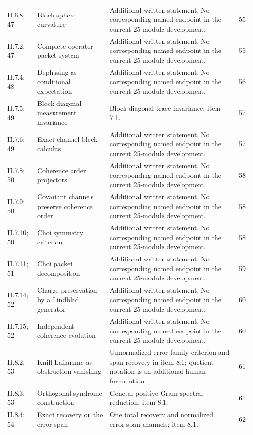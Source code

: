 {\begin{longtable}{@{}p{.13\linewidth}p{.31\linewidth}p{.42\linewidth}r@{}}
II.6.8; 47 & Bloch sphere curvature & Additional written statement. No corresponding named endpoint in the current 25-module development. & 55\\
II.7.2; 47 & Complete operator packet system & Additional written statement. No corresponding named endpoint in the current 25-module development. & 55\\
II.7.4; 48 & Dephasing as conditional expectation & Additional written statement. No corresponding named endpoint in the current 25-module development. & 56\\
II.7.5; 49 & Block diagonal measurement invariance & Block-diagonal trace invariance; item 7.1. & 57\\
II.7.6; 49 & Exact channel block calculus & Additional written statement. No corresponding named endpoint in the current 25-module development. & 57\\
II.7.8; 50 & Coherence order projectors & Additional written statement. No corresponding named endpoint in the current 25-module development. & 58\\
II.7.9; 50 & Covariant channels preserve coherence order & Additional written statement. No corresponding named endpoint in the current 25-module development. & 58\\
II.7.10; 50 & Choi symmetry criterion & Additional written statement. No corresponding named endpoint in the current 25-module development. & 58\\
II.7.11; 51 & Choi packet decomposition & Additional written statement. No corresponding named endpoint in the current 25-module development. & 59\\
II.7.14; 52 & Charge preservation by a Lindblad generator & Additional written statement. No corresponding named endpoint in the current 25-module development. & 60\\
II.7.15; 52 & Independent coherence evolution & Additional written statement. No corresponding named endpoint in the current 25-module development. & 60\\
II.8.2; 53 & Knill Laflamme as obstruction vanishing & Unnormalized error-family criterion and span recovery in item 8.1; quotient notation is an additional human formulation. & 61\\
II.8.3; 53 & Orthogonal syndrome construction & General positive Gram spectral reduction; item 8.1. & 61\\
II.8.4; 54 & Exact recovery on the error span & One total recovery and normalized error-span channels; item 8.1. & 62\\

\end{longtable}}
